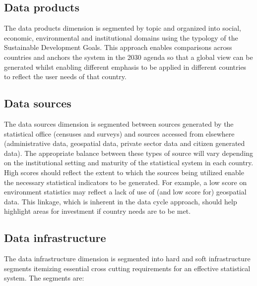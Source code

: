 \documentclass[
]{article}
\begin{document}
\hypertarget{data-products}{%
\subsection{Data products}\label{data-products}}

The data products dimension is segmented by topic and organized into social, economic, environmental and institutional domains using the typology of the Sustainable Development Goals. This approach enables comparisons across countries and anchors the system in the 2030 agenda so that a global view can be generated whilst enabling different emphasis to be applied in different countries to reflect the user needs of that country.

\hypertarget{data-sources}{%
\subsection{Data sources}\label{data-sources}}

The data sources dimension is segmented between sources generated by the statistical office (censuses and surveys) and sources accessed from elsewhere (administrative data, geospatial data, private sector data and citizen generated data). The appropriate balance between these types of source will vary depending on the institutional setting and maturity of the statistical system in each country. High scores should reflect the extent to which the sources being utilized enable the necessary statistical indicators to be generated. For example, a low score on environment statistics may reflect a lack of use of (and low score for) geospatial data. This linkage, which is inherent in the data cycle approach, should help highlight areas for investment if country needs are to be met.

\hypertarget{data-infrastructure}{%
\subsection{Data infrastructure}\label{data-infrastructure}}

The data infrastructure dimension is segmented into hard and soft infrastructure segments itemizing essential cross cutting requirements for an effective statistical system. The segments are:
\end{document}
